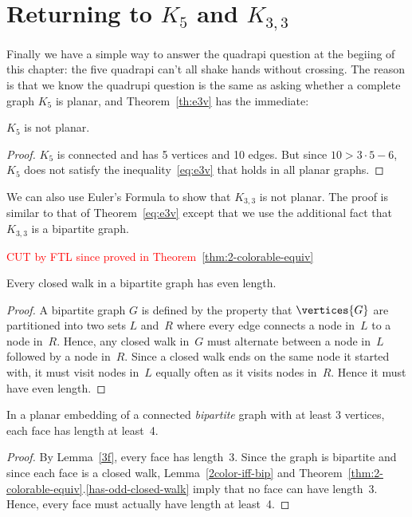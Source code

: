 \section{Returning to $K_5$ and $K_{3,3}$}

Finally we have a simple way to answer the quadrapi question at the
begiing of this chapter: the five quadrapi can't all shake hands without
crossing.  The reason is that we know the quadrupi question is the same as
asking whether a complete graph $K_5$ is planar, and 
Theorem~\ref{th:e3v} has the immediate:
\begin{corollary}\label{k5not}
$K_5$ is not planar.
\end{corollary}
\begin{proof}
  $K_5$ is connected and has 5 vertices and 10 edges.  But since $10 > 3
  \cdot 5-6$, $K_5$ does not satisfy the inequality~\eqref{eq:e3v} that
  holds in all planar graphs.
\end{proof}

We can also use Euler's Formula to show that $K_{3, 3}$ is not
planar.  The proof is similar to that of Theorem~\ref{eq:e3v} except that
we use the additional fact that $K_{3, 3}$ is a bipartite graph.

\begin{editingnotes}
\textcolor{red}{CUT by FTL since proved in Theorem~\ref{thm:2-colorable-equiv}}

\begin{lemma*}\label{lem:5D5}
Every closed walk in a bipartite graph has even length.
\end{lemma*}

\begin{proof}
A bipartite graph $G$ is defined by the property that $\vertices{G}$
are partitioned into two sets $L$ and~$R$ where every edge
connects a node in~$L$ to a node in~$R$.  Hence, any closed walk
in~$G$ must alternate between a node in~$L$ followed by a node
in~$R$.  Since a closed walk ends on the same node it started with, it
must visit nodes in~$L$ equally often as it visits nodes in~$R$.
Hence it must have even length.
\end{proof}

\begin{corollary}\label{cor:5D6}
In a planar embedding of a connected \emph{bipartite} graph with at
least 3 vertices, each face has length at least~4.
\end{corollary}
\begin{proof}
  By Lemma~\ref{3f}, every face has length~3.  Since the graph is
  bipartite and since each face is a closed walk,
  Lemma~\ref{2color-iff-bip} and
  Theorem~\ref{thm:2-colorable-equiv}.\ref{has-odd-closed-walk} imply that
  no face can have length~3.  Hence, every face must actually have length
  at least~4.
\end{proof}
\end{editingnotes}

